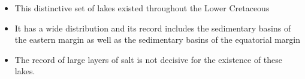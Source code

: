 \documentclass[aspectratio=169]{beamer} %
\begin{document}
{{{\begin{frame}
\begin{flushright}
\begin{columns}
        \centering
         \begin{itemize}
          \item This distinctive set of lakes existed throughout the Lower Cretaceous    
          \pause
           \item It has a wide distribution and its record includes the sedimentary basins of the eastern margin as well as the sedimentary basins of the equatorial margin
           \pause
          \item The record of large layers of salt is not decisive for the existence of these lakes.
           \pause
     
         \end{itemize}	     	
    \end{columns}

\end{flushright}

\begin{flushright}
\citep{kelts1988,Talbot1988,Goncalves2001,Wright2018,Boyd2015,Neves2019}
\end{flushright}
\end{frame} }

{

{ \begin{frame}
	\vspace{1cm}
	\begin{center}
	\begin{large}
	\color{blue}{Pre-salt lakes}
	\end{large}
	\end{center}
\begin{flushright}
    \begin{columns}


\end{columns}
\end{flushright}
\end{frame}}}}}
\end{document}
